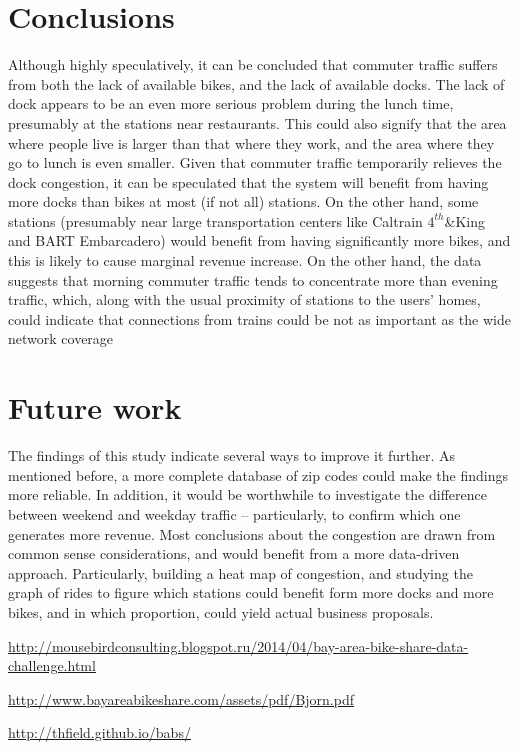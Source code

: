 \documentclass{article}
\begin{document}
\section{Conclusions}
\label{sec:conclusions}
Although highly speculatively, it can be concluded that commuter traffic suffers from both the lack of available bikes, and the lack of available docks. The lack of dock appears to be an even more serious problem during the lunch time, presumably at the stations near restaurants. This could also signify that the area where people live is larger than that where they work, and the area where they go to lunch is even smaller. Given that commuter traffic temporarily relieves the dock congestion, it can be speculated that the system will benefit from having more docks than bikes at most (if not all) stations. On the other hand, some stations (presumably near large transportation centers like Caltrain $4^{th}$\&King and BART Embarcadero) would benefit from having significantly more bikes, and this is likely to cause marginal revenue increase. On the other hand, the data suggests that morning commuter traffic tends to concentrate more than evening traffic, which, along with the usual proximity of stations to the users' homes, could indicate that connections from trains could be not as important as the wide network coverage

\section{Future work}
The findings of this study indicate several ways to improve it further. As mentioned before, a more complete database of zip codes could make the findings more reliable. In addition, it would be worthwhile to investigate the difference between weekend and weekday traffic -- particularly, to confirm which one generates more revenue. Most conclusions about the congestion are drawn from common sense considerations, and would benefit from a more data-driven approach. Particularly, building a heat map of congestion, and studying the graph of rides to figure which stations could benefit form more docks and more bikes, and in which proportion, could yield actual business proposals.



\begin{thebibliography}{9}

\url{http://mousebirdconsulting.blogspot.ru/2014/04/bay-area-bike-share-data-challenge.html}

\url{http://www.bayareabikeshare.com/assets/pdf/Bjorn.pdf}

\url{http://thfield.github.io/babs/}


\end{thebibliography}
\end{document}
